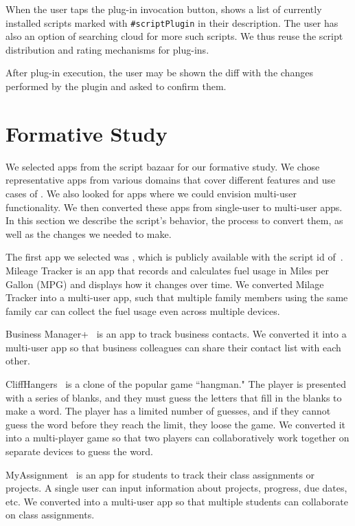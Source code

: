 \documentclass[preprint]{sigplanconf}
\begin{document}
When the user taps the plug-in invocation button, \TD shows a list of currently
installed scripts marked with \texttt{\#scriptPlugin} in their description.
The user has also an option of searching \TD cloud for more such scripts.
We thus reuse the script distribution and rating mechanisms for plug-ins.

After plug-in execution, the user may be shown the diff with the changes performed
by the plugin and asked to confirm them.

\section{Formative Study}
\label{sec:Formative}

We selected \numFormative apps from the \TD script bazaar for our formative study. 
We chose representative apps from various domains that cover different features and use cases of \TD.  We also looked for apps where we could envision multi-user functionality.
We then converted these apps from single-user to multi-user apps. In this section we describe the script's behavior, the process to convert them, as well as the changes we needed to make.

The first app we selected was \MT, which is publicly available with the script id of~\cite{MileageTracker}.  Mileage Tracker is an app that records and calculates fuel usage in Miles per Gallon (MPG) and displays how it changes over time. We converted Milage Tracker into a multi-user app, such that multiple family members using the same family car can collect the fuel usage even across multiple devices.

Business Manager+~\cite{BusinessManager} is an app to track business contacts.  We converted it into a multi-user app so that business colleagues can share their contact list with each other.

CliffHangers~\cite{CliffHangers} is a clone of the popular game ``hangman."  The player is presented with a series of blanks, and they must guess the letters that fill in the blanks to make a word.  The player has a limited number of guesses, and if they cannot guess the word before they reach the limit, they loose the game.  We converted it into a multi-player game so that two players can collaboratively work together on separate devices to guess the word.

MyAssignment~\cite{MyAssignments} is an app for students to track their class assignments or projects.  A single user can input information about projects, progress, due dates, etc.  We converted into a multi-user app so that multiple students can collaborate on class assignments.
\end{document}

